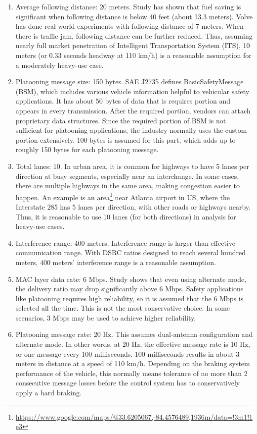 \documentclass[12pt]{report}
\begin{document}
\begin{enumerate}
  \item Average following distance: 20 meters. Study \cite{watts2015computational} has shown that fuel saving is significant when following distance is below 40 feet (about 13.3 meters). Volve \cite{volvo2015} has done real-world experiments with following distance of 7 meters. When there is traffic jam, following distance can be further reduced. Thus, assuming nearly full market penetration of Intelligent Transportation System (ITS), 10 meters (or 0.33 seconds headway at 110 km/h) is a reasonable assumption for a moderately heavy-use case.
  \item Platooning message size: 150 bytes. SAE J2735 defines BasicSafetyMessage (BSM), which includes various vehicle information helpful to vehicular safety applications. It has about 50 bytes of data that is requires portion and appears in every transmission. After the required portion, vendors can attach proprietary data structures. Since the required portion of BSM is not sufficient for platooning applications, the industry normally uses the custom portion extensively. 100 bytes is assumed for this part, which adds up to roughly 150 bytes for each platooning message.
  \item Total lanes: 10. In urban area, it is common for highways to have 5 lanes per direction at busy segments, especially near an interchange. In some cases, there are multiple highways in the same area, making congestion easier to happen. An example is an area\footnote{\url{https://www.google.com/maps/@33.6205067,-84.4576489,1936m/data=!3m1!1e3}} near Atlanta airport in US, where the Interstate 285 has 5 lanes per direction, with other roads or highways nearby. Thus, it is reasonable to use 10 lanes (for both directions) in analysis for heavy-use cases.
  \item Interference range: 400 meters. Interference range is larger than effective communication range. With DSRC ratios designed to reach several hundred meters, 400 meters' interference range is a reasonable assumption.
  \item MAC layer data rate: 6 Mbps. Study \cite{songDSRC2016} shows that even using alternate mode, the delivery ratio may drop significantly above 6 Mbps. Safety applications like platooning requires high reliability, so it is assumed that the 6 Mbps is selected all the time. This is not the most conservative choice. In some scenarios, 3 Mbps may be used to achieve higher reliability.
  \item Platooning message rate: 20 Hz. This assumes dual-antenna configuration and alternate mode. In other words, at 20 Hz, the effective message rate is 10 Hz, or one message every 100 milliseconds. 100 milliseconds results in about 3 meters in distance at a speed of 110 km/h. Depending on the braking system performance of the vehicle, this normally means tolerance of no more than 2 consecutive message losses before the control system has to conservatively apply a hard braking.
\end{enumerate}
\end{document}
